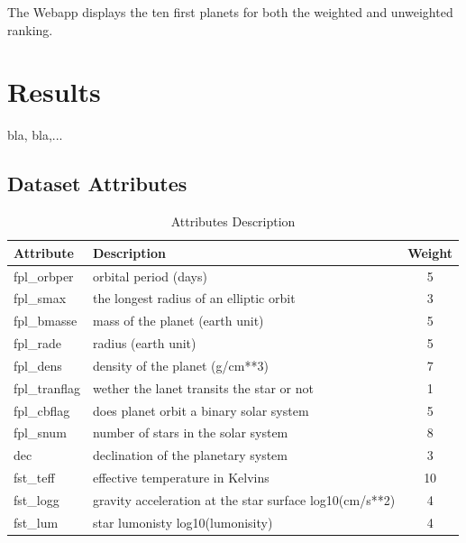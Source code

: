 \documentclass[12p]{article}
\begin{document}
The Webapp displays the ten first planets for both the weighted and unweighted ranking.


\section{Results}
bla, bla,...


\printbibliography

\appendix

\begin{landscape}
    \section{Dataset Attributes}
    \begin{table}[!h]\centering
        \caption{Attributes Description}
        \label{tab:att_desc}
        \begin{tabular}{|l l c|}\hline
            Attribute         & Description & Weight \\ \hline\hline
            fpl\_orbper      & orbital period (days) & 5 \\ \hline
            fpl\_smax        & the longest radius of an elliptic orbit & 3 \\ \hline
            fpl\_bmasse    & mass of the planet (earth unit) & 5 \\ \hline
            fpl\_rade         & radius (earth unit) & 5 \\ \hline
            fpl\_dens        & density of the planet (g/cm**3) & 7 \\ \hline
            fpl\_tranflag    & wether the lanet transits the star or not & 1 \\ \hline
            fpl\_cbflag      & does planet orbit a binary solar system & 5 \\ \hline
            fpl\_snum       & number of stars in the solar system & 8 \\ \hline
            dec                 & declination of the planetary system & 3 \\ \hline
            fst\_teff          & effective temperature in Kelvins & 10 \\ \hline
            fst\_logg        & gravity acceleration at the star surface log10(cm/s**2) & 4 \\ \hline
            fst\_lum         & star lumonisty log10(lumonisity) & 4 \\ \hline

\end{tabular}
\end{table}
\end{landscape}
\end{document}
